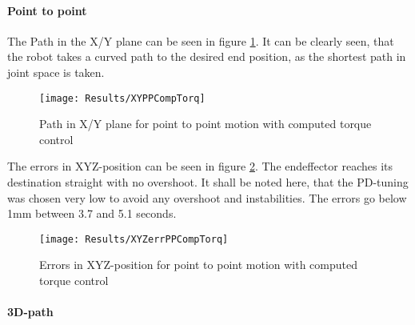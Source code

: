 \paragraph{Point to point}
The Path in the X/Y plane can be seen in figure  \ref{fig:XYPPCompTorq}. 
It can be clearly seen, that the robot takes a curved path to the desired end position, as the shortest path in joint space is taken.
\begin{figure}[H]
	\texttt{[image: Results/XYPPCompTorq]}
	\caption{Path in X/Y plane for point to point motion with computed torque control}
	\label{fig:XYPPCompTorq}
\end{figure}
The errors in XYZ-position can be seen in figure \ref{fig:XYZerrPPCompTorq}. %
The endeffector reaches its destination straight with no overshoot. It shall be noted here, that the PD-tuning was chosen very low to avoid any overshoot and instabilities. The errors go below 1mm between 3.7 and 5.1 seconds.
\begin{figure}[H]
	\texttt{[image: Results/XYZerrPPCompTorq]}
	\caption{Errors in XYZ-position for point to point motion with computed torque control}
	\label{fig:XYZerrPPCompTorq}
\end{figure}



\paragraph{3D-path}

